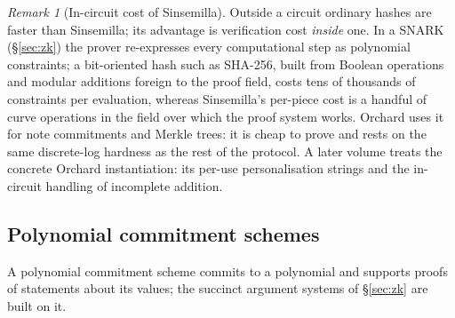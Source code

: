 \documentclass[11pt,a4paper]{article}
\theoremstyle{definition}
\theoremstyle{remark}
\newtheorem{remark}[theorem]{Remark}
\begin{document}
\begin{remark}[In-circuit cost of Sinsemilla]
\label{commitments:rem:sinsemilla-circuit}
Outside a circuit ordinary hashes are faster than Sinsemilla; its
advantage is verification cost \emph{inside} one. In a SNARK
(\S\ref{sec:zk}) the prover re-expresses every computational step as
polynomial constraints; a bit-oriented hash such as SHA-256, built from
Boolean operations and modular additions foreign to the proof field,
costs tens of thousands of constraints per evaluation, whereas
Sinsemilla's per-piece cost is a handful of curve operations in the
field over which the proof system works. Orchard uses it for note
commitments and Merkle trees: it is cheap to prove and rests on the same
discrete-log hardness as the rest of the protocol. A later volume
treats the concrete Orchard instantiation: its per-use personalisation
strings and the in-circuit handling of incomplete addition.
\end{remark}

\subsection{Polynomial commitment schemes}
\label{commitments:subsec:poly}

A polynomial commitment scheme commits to a polynomial and supports
proofs of statements about its values; the succinct argument systems of
\S\ref{sec:zk} are built on it.
\end{document}
